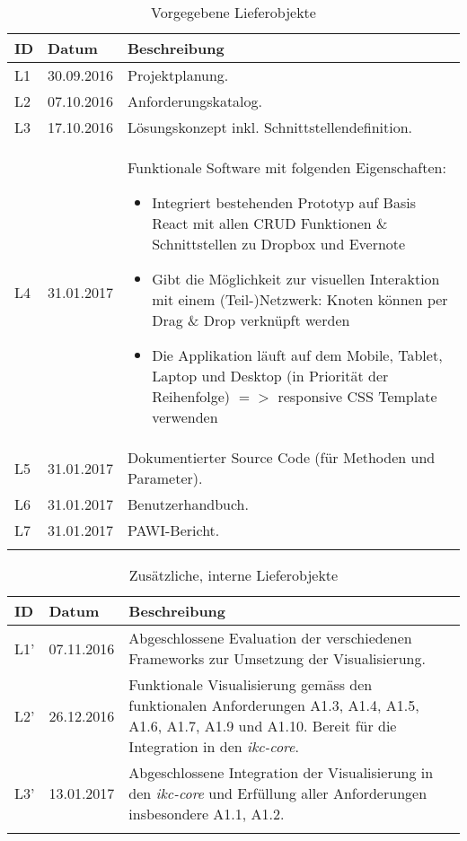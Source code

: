 \begin{longtable}{|p{1cm} | p{2cm} | p{8.1cm}|}
  \hline
    ID & Datum &  Beschreibung \\\hline
    L1 & 30.09.2016 & Projektplanung.\\\hline
    L2 & 07.10.2016 & Anforderungskatalog.\\\hline
    L3 & 17.10.2016 & Lösungskonzept inkl. Schnittstellendefinition.\\\hline
    L4 & 31.01.2017 & Funktionale Software mit folgenden Eigenschaften:
    \begin{itemize}
        \item Integriert bestehenden Prototyp auf Basis React mit allen CRUD     Funktionen \& Schnittstellen zu Dropbox und Evernote
        \item Gibt die Möglichkeit zur visuellen Interaktion mit einem 
            (Teil-)Netzwerk: Knoten können per Drag \& Drop verknüpft werden
        \item Die Applikation läuft auf dem Mobile, Tablet, Laptop und Desktop (in     Priorität der Reihenfolge) $=>$ responsive CSS Template verwenden
    \end{itemize}
    \\\hline
    L5 & 31.01.2017 & Dokumentierter Source Code (für Methoden und Parameter).\\\hline
    L6 & 31.01.2017 & Benutzerhandbuch.\\\hline
    L7 & 31.01.2017 & PAWI-Bericht.\\\hline
    \caption{Vorgegebene Lieferobjekte}
  \label{tab:set-lieferobjekte}
\end{longtable}
 
\begin{longtable}{|p{1cm} | p{2cm} | p{8.1cm}|}
  \hline
    ID & Datum &  Beschreibung \\\hline
    L1' & 07.11.2016 & Abgeschlossene Evaluation der verschiedenen Frameworks zur Umsetzung der Visualisierung.\\\hline
    L2' & 26.12.2016 & Funktionale Visualisierung gemäss den funktionalen Anforderungen A1.3, A1.4, A1.5, A1.6, A1.7, A1.9 und A1.10. Bereit für die Integration in den \textit{ikc-core}.\\\hline
    L3' & 13.01.2017 & Abgeschlossene Integration der Visualisierung in den \textit{ikc-core} und Erfüllung aller Anforderungen insbesondere A1.1, A1.2.\\\hline
    \caption{Zusätzliche, interne Lieferobjekte}
  \label{tab:add-lieferobjekte}
\end{longtable}




